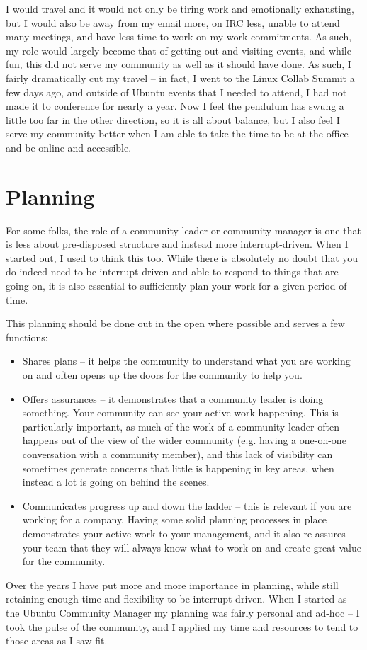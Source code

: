 I would travel and it would not only be tiring work and emotionally exhausting,
but I would also be away from my email more, on IRC less, unable to attend many
meetings, and have less time to work on my work commitments. As such, my role
would largely become that of getting out and visiting events, and while fun,
this did not serve my community as well as it should have done. As such, I
fairly dramatically cut my travel -- in fact, I went to the Linux Collab Summit
a few days ago, and outside of Ubuntu events that I needed to attend, I had not
made it to conference for nearly a year. Now I feel the pendulum has swung a
little too far in the other direction, so it is all about balance, but I also
feel I serve my community better when I am able to take the time to be at the
office and be online and accessible.

\section*{Planning}

For some folks, the role of a community leader or community manager is one that
is less about pre-disposed structure and instead more interrupt-driven. When I
started out, I used to think this too. While there is absolutely no doubt that
you do indeed need to be interrupt-driven and able to respond to things that are
going on, it is also essential to sufficiently plan your work for a given period
of time.

This planning should be done out in the open where possible and serves a few
functions:
\begin{itemize}
 \item Shares plans -- it helps the community to understand what you are working
on and often opens up the doors for the community to help you.
 \item Offers assurances -- it demonstrates that a community leader is doing something.
Your community can see your active work happening. This is particularly
important, as much of the work of a community leader often happens out of the
view of the wider community (e.g. having a one-on-one conversation with a
community member), and this lack of visibility can sometimes generate concerns
that little is happening in key areas, when instead a lot is going on behind the
scenes.
 \item Communicates progress up and down the ladder -- this is relevant if you
are working for a company. Having some solid planning processes in place
demonstrates your active work to your management, and it also re-assures your
team that they will always know what to work on and create great value for the
community.
\end{itemize}
Over the years I have put more and more importance in planning, while still
retaining enough time and flexibility to be interrupt-driven. When I started as
the Ubuntu Community Manager my planning was fairly personal and ad-hoc -- I
took the pulse of the community, and I applied my time and resources to tend to
those areas as I saw fit.

